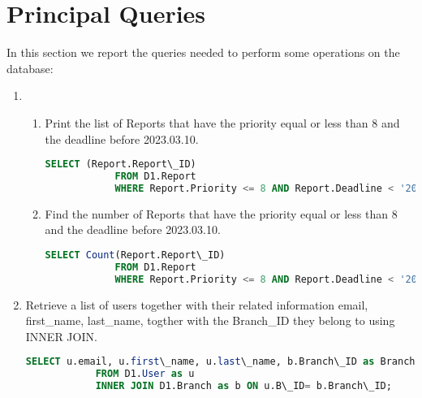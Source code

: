 \documentclass{article}
\begin{document}
\section{Principal Queries}

In this section we report the queries needed to perform some operations on the database:

\begin{enumerate}
\item 
\begin{enumerate}
  \item Print the list of Reports that have the priority equal or less than 8 and the deadline before 2023.03.10.


        \begin{lstlisting}[language=SQL,
        keywordstyle=\color{blue},
        stringstyle=\color{mauve},
        showstringspaces=false,
        basicstyle=\ttfamily\footnotesize]
            SELECT (Report.Report\_ID)
            FROM D1.Report
            WHERE Report.Priority <= 8 AND Report.Deadline < '2023.03.10'; 
        \end{lstlisting}
        

  \item Find the number of Reports that have the priority equal or less than 8 and the deadline before 2023.03.10.
        \begin{lstlisting}[language=SQL,
        keywordstyle=\color{blue},
        stringstyle=\color{mauve},
        showstringspaces=false,
        basicstyle=\ttfamily\footnotesize]
            SELECT Count(Report.Report\_ID)
            FROM D1.Report
            WHERE Report.Priority <= 8 AND Report.Deadline < '2023.03.10'; 
        \end{lstlisting}

\end{enumerate}

    \item Retrieve a list of users together with their related information email, first\_name, last\_name, togther with the Branch\_ID they belong to using INNER JOIN.


        \begin{lstlisting}[language=SQL,
        keywordstyle=\color{blue},
        stringstyle=\color{mauve},
        showstringspaces=false,
        basicstyle=\ttfamily\footnotesize]
            SELECT u.email, u.first\_name, u.last\_name, b.Branch\_ID as Branch
            FROM D1.User as u
            INNER JOIN D1.Branch as b ON u.B\_ID= b.Branch\_ID;
        \end{lstlisting}
        

\end{enumerate}
\end{document}
